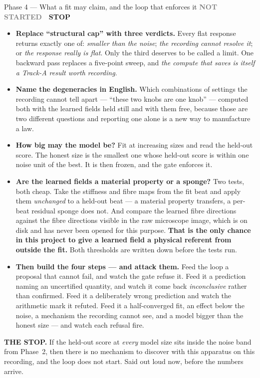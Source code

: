 \documentclass[11pt,a4paper]{article}
\newcommand{\todo}{\textcolor{grey}{\textbf{NOT STARTED}}}
\newcommand{\stopp}{\textcolor{bad!30!white}{\textbf{STOP}}}
\begin{document}
\begin{phasebox}{Phase 4 --- What a fit may claim, and the loop that enforces it \hfill \todo\ \ \stopp}
\begin{itemize}
\item \textbf{Replace ``structural cap'' with three verdicts.} Every flat response returns exactly
one of: \emph{smaller than the noise}; \emph{the recording cannot resolve it}; or \emph{the response
really is flat}. Only the third deserves to be called a limit. One backward pass replaces a
five-point sweep, and \emph{the compute that saves is itself a Track-A result worth recording}.
\item \textbf{Name the degeneracies in English.} Which combinations of settings the recording cannot
tell apart --- ``these two knobs are one knob'' --- computed both with the learned fields held still
and with them free, because those are two different questions and reporting one alone is a new way to
manufacture a law.
\item \textbf{How big may the model be?} Fit at increasing sizes and read the held-out score. The
honest size is the smallest one whose held-out score is within one noise unit of the best. It is then
frozen, and the gate enforces it.
\item \textbf{Are the learned fields a material property or a sponge?} Two tests, both cheap. Take
the stiffness and fibre maps from the fit beat and apply them \emph{unchanged} to a held-out beat ---
a material property transfers, a per-beat residual sponge does not. And compare the learned fibre
directions against the fibre directions visible in the raw microscope image, which is on disk and has
never been opened for this purpose. \textbf{That is the only chance in this project to give a learned
field a physical referent from outside the fit.} Both thresholds are written down before the tests
run.
\item \textbf{Then build the four steps --- and attack them.} Feed the loop a proposal that cannot
fail, and watch the gate refuse it. Feed it a prediction naming an uncertified quantity, and watch it
come back \emph{inconclusive} rather than confirmed. Feed it a deliberately wrong prediction and watch
the arithmetic mark it refuted. Feed it a half-converged fit, an effect below the noise, a mechanism
the recording cannot see, and a model bigger than the honest size --- and watch each refusal fire.
\end{itemize}

\begin{stopbox}
\textbf{THE STOP.} If the held-out score at \emph{every} model size sits inside the noise band from
Phase~2, then there is no mechanism to discover with this apparatus on this recording, and the loop
does not start. Said out loud now, before the numbers arrive.
\end{stopbox}


\end{phasebox}
\end{document}
